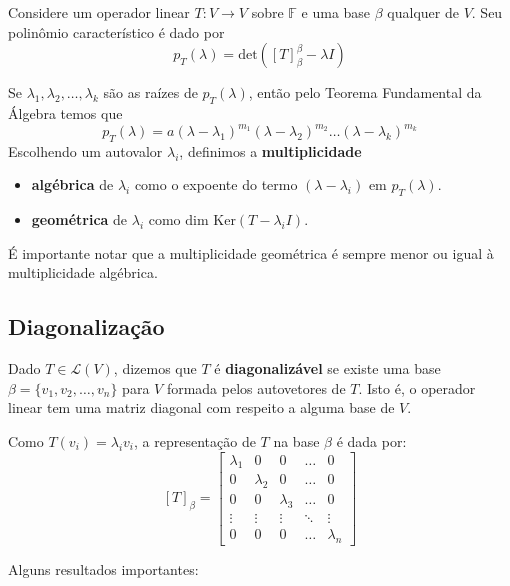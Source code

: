 \documentclass[12pt,a4paper]{article}
\begin{document}
Considere um operador linear $T:V\to V$ sobre $\mathbb{F}$ e uma base $\beta$ qualquer de $V$. Seu polinômio característico é dado por \[ p_T(\lambda) = \text{det}([T]_\beta^{\beta} - \lambda I) \]

Se $\lambda_1, \lambda_2, \ldots, \lambda_k$ são as raízes de $p_T(\lambda)$, então pelo Teorema Fundamental da Álgebra temos que
\[
p_T(\lambda) = a(\lambda - \lambda_1)^{m_1} (\lambda - \lambda_2)^{m_2} \ldots (\lambda - \lambda_k)^{m_k}
\]
Escolhendo um autovalor $\lambda_i$, definimos a \textbf{multiplicidade}

\begin{itemize}
\item \textbf{algébrica} de $\lambda_i$ como o expoente do termo $(\lambda - \lambda_i)$ em $p_T(\lambda)$.
\item \textbf{geométrica} de $\lambda_i$ como $\text{dim Ker}(T - \lambda_i I)$.
\end{itemize}

É importante notar que a multiplicidade geométrica é sempre menor ou igual à multiplicidade algébrica.

\subsection{Diagonalização}

Dado $T \in \mathcal{L}(V)$, dizemos que $T$ é \textbf{diagonalizável} se existe uma base $\beta = \{ v_1, v_2, \ldots, v_n \}$ para $V$ formada pelos autovetores de $T$. Isto é, o operador linear tem uma matriz diagonal com respeito a alguma base de $V$.

Como $T(v_i) = \lambda_i v_i$, a representação de $T$ na base $\beta$ é dada por:
\[
[T]_{\beta} = \begin{bmatrix}
\lambda_1 & 0 & 0 & \ldots & 0 \\
0 & \lambda_2 & 0 & \ldots & 0 \\
0 & 0 & \lambda_3 & \ldots & 0 \\
\vdots & \vdots & \vdots & \ddots & \vdots \\
0 & 0 & 0 & \ldots & \lambda_n
\end{bmatrix}
\]

Alguns resultados importantes:
\end{document}
